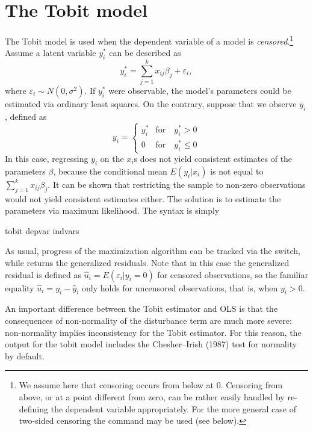 \section{The Tobit model}
\label{sec:tobit}

The Tobit model is used when the dependent variable of a model is
\emph{censored}.\footnote{We assume here that censoring occurs from
  below at 0. Censoring from above, or at a point different from zero,
  can be rather easily handled by re-defining the dependent variable
  appropriately. For the more general case of two-sided censoring the
   command may be used (see below).}  
Assume a latent variable $y^*_i$ can be described
as
%
\[
  y^*_i = \sum_{j=1}^k x_{ij} \beta_j + \varepsilon_i ,
\]
%
where $\varepsilon_i \sim N(0,\sigma^2)$. If $y^*_i$ were observable,
the model's parameters could be estimated via ordinary least squares.
On the contrary, suppose that we observe $y_i$, defined as
%
\begin{equation}
  \label{eq:tobit}
  y_i = \left\{ 
    \begin{array}{ll} 
      y^*_i & \mathrm{for} \quad y^*_i > 0 \\ 
      0 & \mathrm{for} \quad y^*_i \le 0 
    \end{array}
    \right. 
\end{equation}
%
In this case, regressing $y_i$ on the $x_i$s does not yield
consistent estimates of the parameters $\beta$, because the
conditional mean $E(y_i|x_i)$ is not equal to $\sum_{j=1}^k x_{ij}
\beta_j$.  It can be shown that restricting the sample to non-zero
observations would not yield consistent estimates either. The solution
is to estimate the parameters via maximum likelihood. The syntax is
simply
%
\begin{code}
tobit depvar indvars
\end{code}

As usual, progress of the maximization algorithm can be tracked via
the  switch, while  returns the
generalized residuals. Note that in this case the generalized residual
is defined as $\hat{u}_i = E(\varepsilon_i | y_i = 0)$ for censored
observations, so the familiar equality $\hat{u}_i = y_i - \hat{y}_i$
only holds for uncensored observations, that is, when $y_i>0$.

An important difference between the Tobit estimator and OLS is that
the consequences of non-normality of the disturbance term are much
more severe: non-normality implies inconsistency for the Tobit
estimator. For this reason, the output for the tobit model includes
the Chesher--Irish (1987) test for normality by default.

